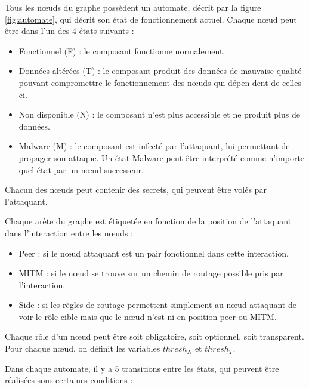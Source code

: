 \documentclass[a4paper]{article}
\begin{document}
    Tous les n\oe uds du graphe possèdent un automate, décrit par la figure \ref{fig:automate}, qui décrit son état de fonctionnement actuel.
    Chaque n\oe ud peut être dans l'un des 4 états suivants :

    \begin{itemize}
        \item Fonctionnel (F) : le composant fonctionne normalement.
        \item Données altérées (T) : le composant produit des données de mauvaise qualité pouvant compromettre le fonctionnement des n\oe uds qui dépen-dent de celles-ci. 
        \item Non disponible (N) : le composant n'est plus accessible et ne produit plus de données.
        \item Malware (M) : le composant est infecté par l'attaquant, lui permettant de propager son attaque. Un état Malware peut être interprété comme n'importe quel état par un n\oe ud successeur.
    \end{itemize}

    Chacun des n\oe uds peut contenir des secrets, qui peuvent être volés par l'attaquant.

    Chaque arête du graphe est étiquetée en fonction de la position de l'attaquant dans l'interaction entre les n\oe uds :

    \begin{itemize}
        \item Peer : si le n\oe ud attaquant est un pair fonctionnel dans cette interaction.
        \item MITM : si le n\oe ud se trouve sur un chemin de routage possible pris par l'interaction.
        \item Side : si les règles de routage permettent simplement au n\oe ud attaquant de voir le rôle cible mais que le n\oe ud n'est ni en position peer ou MITM.
    \end{itemize}

    Chaque rôle d'un n\oe ud peut être soit obligatoire, soit optionnel, soit transparent.
    Pour chaque n\oe ud, on définit les variables $thresh_N$ et $thresh_T$.

    Dans chaque automate, il y a 5 transitions entre les états, qui peuvent être réalisées sous certaines conditions :
\end{document}
